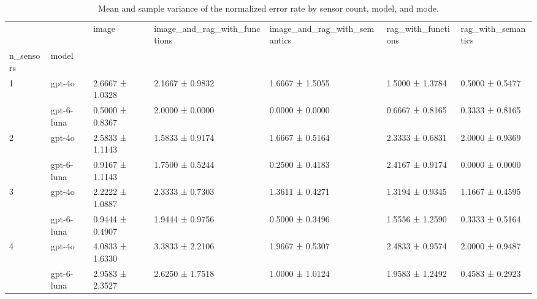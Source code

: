 \begin{table}
\caption{Mean and sample variance of the normalized error rate by sensor count, model, and mode.}
\label{tab:spatial_reasoning}
\begin{tabular}{lllllll}
\toprule
 &  & image & image\_and\_rag\_with\_functions & image\_and\_rag\_with\_semantics & rag\_with\_functions & rag\_with\_semantics \\
n_sensors & model &  &  &  &  &  \\
\midrule
\multirow[t]{2}{*}{1} & gpt-4o & 2.6667 ± 1.0328 & 2.1667 ± 0.9832 & 1.6667 ± 1.5055 & 1.5000 ± 1.3784 & 0.5000 ± 0.5477 \\
 & gpt-6-luna & 0.5000 ± 0.8367 & 2.0000 ± 0.0000 & 0.0000 ± 0.0000 & 0.6667 ± 0.8165 & 0.3333 ± 0.8165 \\
\cline{1-7}
\multirow[t]{2}{*}{2} & gpt-4o & 2.5833 ± 1.1143 & 1.5833 ± 0.9174 & 1.6667 ± 0.5164 & 2.3333 ± 0.6831 & 2.0000 ± 0.9369 \\
 & gpt-6-luna & 0.9167 ± 1.1143 & 1.7500 ± 0.5244 & 0.2500 ± 0.4183 & 2.4167 ± 0.9174 & 0.0000 ± 0.0000 \\
\cline{1-7}
\multirow[t]{2}{*}{3} & gpt-4o & 2.2222 ± 1.0887 & 2.3333 ± 0.7303 & 1.3611 ± 0.4271 & 1.3194 ± 0.9345 & 1.1667 ± 0.4595 \\
 & gpt-6-luna & 0.9444 ± 0.4907 & 1.9444 ± 0.9756 & 0.5000 ± 0.3496 & 1.5556 ± 1.2590 & 0.3333 ± 0.5164 \\
\cline{1-7}
\multirow[t]{2}{*}{4} & gpt-4o & 4.0833 ± 1.6330 & 3.3833 ± 2.2106 & 1.9667 ± 0.5307 & 2.4833 ± 0.9574 & 2.0000 ± 0.9487 \\
 & gpt-6-luna & 2.9583 ± 2.3527 & 2.6250 ± 1.7518 & 1.0000 ± 1.0124 & 1.9583 ± 1.2492 & 0.4583 ± 0.2923 \\
\cline{1-7}
\bottomrule
\end{tabular}
\end{table}

